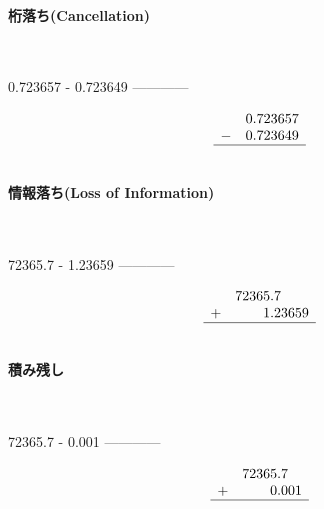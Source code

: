\paragraph{桁落ち(Cancellation)}　
\ifHIKI
\begin{MapleInput}
   0.723657
-  0.723649
------------

\end{MapleInput}
\else
\begin{equation*}
\begin{array}{rr}
  & 0.723657 \\
- & 0.723649\\ \hline
\\
\end{array}
\end{equation*}

\fi

\paragraph{情報落ち(Loss of Information)}　
\ifHIKI
\begin{MapleInput}
   72365.7
-      1.23659
------------

\end{MapleInput}
\else

\begin{equation*}
\begin{array}{rr@{.}l}
  & 72365&7 \\
+& 1&23659\\ \hline
\\
\end{array}
\end{equation*}
\fi

\paragraph{積み残し}　
\ifHIKI
\begin{MapleInput}
   72365.7
-      0.001
------------

\end{MapleInput}
\else
\begin{equation*}
\begin{array}{rr@{.}l}
  & 72365&7 \\
+& 0&001\\ \hline
\\
\end{array}
\end{equation*}
\fi
